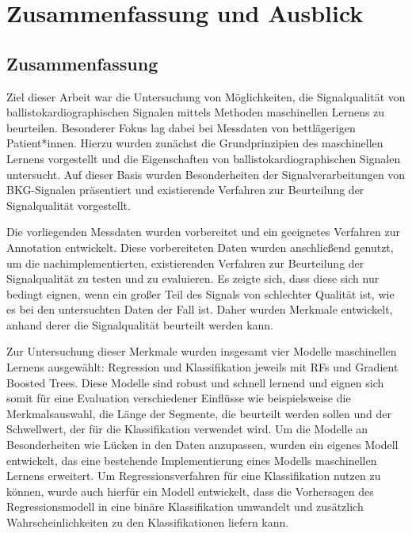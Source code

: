 \chapter{Zusammenfassung und Ausblick}\label{zusammenfassung}

\section{Zusammenfassung}

Ziel dieser Arbeit war die Untersuchung von Möglichkeiten, die Signalqualität von ballistokardiographischen Signalen mittels Methoden maschinellen Lernens zu beurteilen. Besonderer Fokus lag dabei bei Messdaten von bettlägerigen Patient*innen. Hierzu wurden zunächst die Grundprinzipien des maschinellen Lernens vorgestellt und die Eigenschaften von ballistokardiographischen Signalen untersucht. Auf dieser Basis wurden Besonderheiten der Signalverarbeitungen von \ac{BKG}-Signalen präsentiert und existierende Verfahren zur Beurteilung der Signalqualität vorgestellt.

Die vorliegenden Messdaten wurden vorbereitet und ein geeignetes Verfahren zur Annotation entwickelt. Diese vorbereiteten Daten wurden anschließend genutzt, um die nachimplementierten, existierenden Verfahren zur Beurteilung der Signalqualität zu testen und zu evaluieren. Es zeigte sich, dass diese sich nur bedingt eignen, wenn ein großer Teil des Signals von schlechter Qualität ist, wie es bei den untersuchten Daten der Fall ist. Daher wurden Merkmale entwickelt, anhand derer die Signalqualität beurteilt werden kann.

Zur Untersuchung dieser Merkmale wurden insgesamt vier Modelle maschinellen Lernens ausgewählt: Regression und Klassifikation jeweils mit \acl{RF}s und Gradient Boosted Trees. Diese Modelle sind robust und schnell lernend und eignen sich somit für eine Evaluation verschiedener Einflüsse wie beispielsweise die Merkmalsauswahl, die Länge der Segmente, die beurteilt werden sollen und der Schwellwert, der für die Klassifikation verwendet wird. Um die Modelle an Besonderheiten wie Lücken in den Daten anzupassen, wurden ein eigenes Modell entwickelt, das eine bestehende Implementierung eines Modells maschinellen Lernens erweitert. Um Regressionsverfahren für eine Klassifikation nutzen zu können, wurde auch hierfür ein Modell entwickelt, dass die Vorhersagen des Regressionsmodell in eine binäre Klassifikation umwandelt und zusätzlich Wahrscheinlichkeiten zu den Klassifikationen liefern kann.

